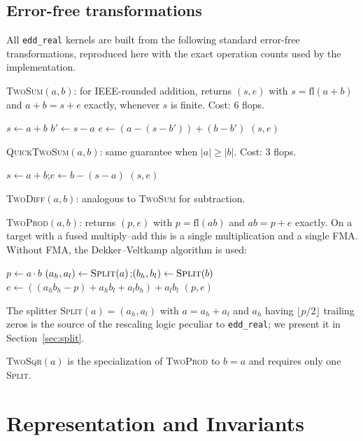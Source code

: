 \documentclass[11pt,a4paper]{article}
\begin{document}
\subsection{Error-free transformations}

All \texttt{edd\_real} kernels are built from the following
standard error-free transformations, reproduced here with the
exact operation counts used by the implementation.

\medskip

\noindent\textsc{TwoSum}$(a,b)$: for IEEE-rounded addition,
returns $(s, e)$ with $s = \mathrm{fl}(a+b)$ and $a+b = s+e$
exactly, whenever $s$ is finite.  Cost: 6 flops.
\begin{algorithmic}[1]
\State $s \gets a + b$
\State $b' \gets s - a$
\State $e \gets (a - (s - b')) + (b - b')$
\State \Return $(s, e)$
\end{algorithmic}

\noindent\textsc{QuickTwoSum}$(a,b)$: same guarantee when $|a| \ge
|b|$.  Cost: 3 flops.
\begin{algorithmic}[1]
\State $s \gets a + b$;\quad $e \gets b - (s - a)$
\State \Return $(s, e)$
\end{algorithmic}

\noindent\textsc{TwoDiff}$(a,b)$: analogous to \textsc{TwoSum} for
subtraction.

\medskip

\noindent\textsc{TwoProd}$(a,b)$: returns $(p, e)$ with $p =
\mathrm{fl}(ab)$ and $ab = p+e$ exactly.  On a target with a fused
multiply--add this is a single multiplication and a single FMA.
Without FMA, the Dekker--Veltkamp algorithm is used:
\begin{algorithmic}[1]
\State $p \gets a \cdot b$
\State $(a_h, a_l) \gets \textsc{Split}(a)$;\quad $(b_h, b_l) \gets \textsc{Split}(b)$
\State $e \gets ((a_h b_h - p) + a_h b_l + a_l b_h) + a_l b_l$
\State \Return $(p, e)$
\end{algorithmic}
The splitter \textsc{Split}$(a) = (a_h, a_l)$ with $a = a_h + a_l$
and $a_h$ having $\lfloor p/2 \rfloor$ trailing zeros is the
source of the rescaling logic peculiar to \texttt{edd\_real}; we
present it in Section~\ref{sec:split}.

\textsc{TwoSqr}$(a)$ is the specialization of \textsc{TwoProd} to
$b=a$ and requires only one \textsc{Split}.

\section{Representation and Invariants}
\label{sec:repr}
\end{document}
